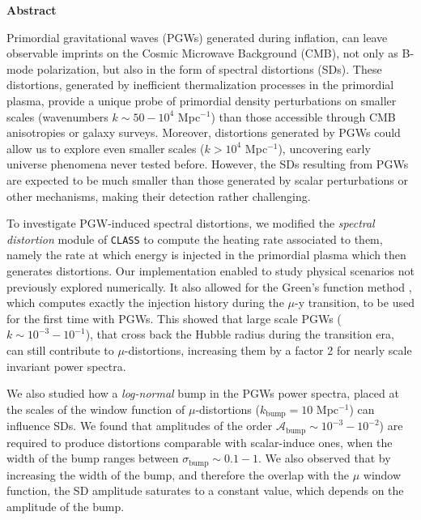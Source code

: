 \vspace*{10pt}
\begin{center}
	\large\textbf{Abstract}\normalsize
\end{center}
\vspace*{10pt}
\begin{adjustwidth}{1cm}{1cm}
Primordial gravitational waves (PGWs) generated during inflation, can leave observable imprints on
the Cosmic Microwave Background (CMB), not only as B-mode polarization, but also in the form of spectral distortions (SDs). These distortions,
generated by inefficient thermalization processes in the primordial plasma, provide a unique probe of
primordial density perturbations on smaller scales (wavenumbers $k \sim 50 - 10^{4}$ Mpc$^{-1}$) than those accessible
through CMB anisotropies or galaxy surveys. Moreover, distortions generated by PGWs could allow us to
explore even smaller scales ($k > 10^{4}$ Mpc$^{-1}$), uncovering early universe phenomena never tested before. However, the SDs resulting from PGWs are expected to be much smaller than those generated by scalar perturbations or other mechanisms, making their detection rather challenging.

To investigate PGW-induced spectral distortions, we modified the \emph{spectral distortion} module of \texttt{\texttt{CLASS}} to compute the heating rate associated to them, namely the rate at which energy is injected in the primordial plasma which then generates distortions. Our implementation enabled to study physical
scenarios not previously explored numerically. It also allowed for the Green’s function method \cite{Chluba_Green}, which computes exactly the injection history during the $\mu$-y transition, to be used for the first time with PGWs. This showed that large scale PGWs ($k\sim 10^{-3}-10^{-1}$), that cross back the Hubble radius during the transition era, can still contribute to $\mu$-distortions, increasing them by a factor 2 for nearly scale invariant power spectra.

We also studied how a \emph{log-normal} bump in the PGWs power spectra, placed at the scales of the window function of $\mu$-distortions ($k_\text{bump}=10$ Mpc$^{-1}$) can influence SDs. We found that amplitudes of the order $\mathcal{A}_\text{bump}\sim 10^{-3}-10^{-2}$) are required to produce distortions comparable with scalar-induce ones, when the width of the bump ranges between $\sigma_\text{bump}\sim 0.1-1$. We also observed that by increasing the width of the bump, and therefore the overlap with the $\mu$ window function, the SD amplitude saturates to a constant value, which depends on the amplitude of the bump. 


\end{adjustwidth}
